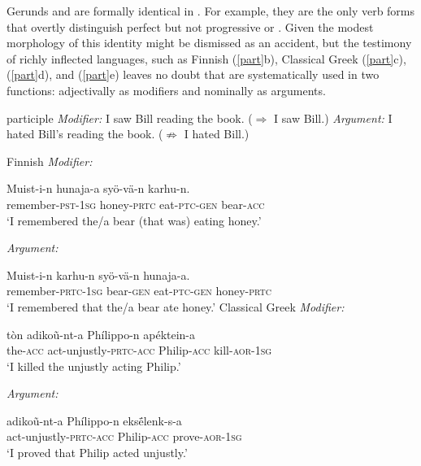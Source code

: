 \documentclass[output=paper,
modfonts
]{LSP/langsci}
\newcommand{\rfa}[2]{(\ref{#1}{#2})}
\begin{document}
Gerunds and  are formally identical in  \citep{pullum1991,yoon1996,huddleston2002,blevins2003k}. For example, they are the only verb forms that overtly
distinguish perfect  but not progressive or .  Given the modest morphology of
 this identity might be dismissed as an accident, but the testimony of richly inflected
languages, such as Finnish \rfa{part}{b}, Classical Greek \rfa{part}{c}, 
\rfa{part}{d}, and  \rfa{part}{e} leaves no doubt that  are systematically used
in two functions: adjectivally as modifiers and nominally as arguments.
\begin{exe}
\ex\label{part}\label{ex:kip:2}
	\ea \label{ex:kip:2a}  participle
		\ea \textit{Modifier:}      I saw Bill reading the book.  ($\Rightarrow$ I saw Bill.)
		\ex \textit{Argument:}        I hated Bill's reading the book.  ($\not\Rightarrow$ I hated Bill.)
		\z    
	
	\ex \label{ex:kip:2b} Finnish 
		\ea \textit{Modifier:} 

		\gll Muist-i-n hunaja-a syö-vä-n karhu-n.\\
		 remember-\textsc{pst}-\textsc{1sg} honey-\textsc{prtc} eat-\textsc{ptc}-\textsc{gen} bear-\textsc{acc}\\
		\glt `I remembered the/a bear (that was) eating honey.' 

		\ex \textit{Argument:}
		
		\gll Muist-i-n  karhu-n  syö-vä-n hunaja-a.\\
		 remember-\textsc{prtc}-\textsc{1sg} bear-\textsc{gen} eat-\textsc{ptc}-\textsc{gen} honey-\textsc{prtc}\\
		\glt `I remembered that the/a bear ate honey.' 
		\z		    
\newpage		    
	\ex \label{ex:kip:2c} Classical Greek 
		\ea \textit{Modifier:} 
 
 		\gll tòn adikoũ-nt-a Phílippo-n apéktein-a\\
		the-\textsc{acc} act-unjustly-\textsc{prtc}-\textsc{acc} Philip-\textsc{acc} kill-\textsc{aor}-\textsc{1sg}\\
		\glt `I killed the unjustly acting Philip.' 

		\ex \textit{Argument:}
		
		\gll adikoũ-nt-a Phílippo-n eksḗlenk-s-a\\
		act-unjustly-\textsc{prtc}-\textsc{acc} Philip-\textsc{acc} prove-\textsc{aor}-\textsc{1sg}\\
		\glt `I proved that Philip acted unjustly.' 
		\z    


\end{exe}
\end{document}
